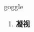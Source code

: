 
\begin{frame}
{\huge goggle}
\begin{center}
\begin{enumerate}\Large
  \item \textbf{凝视}
\end{enumerate}
\end{center}
\end{frame}
